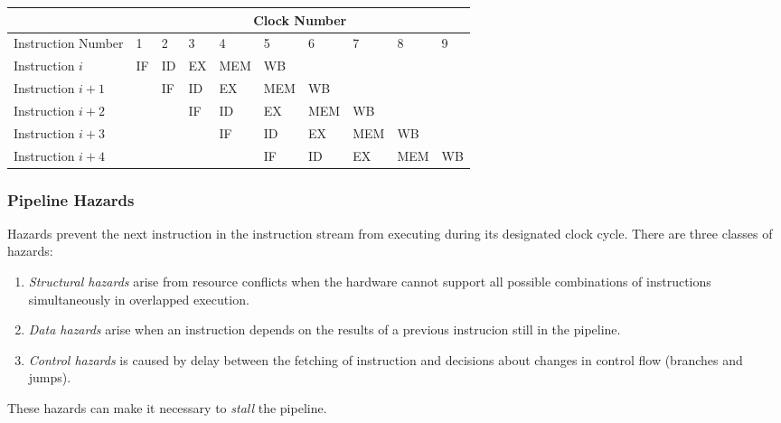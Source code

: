 \documentclass[12pt, a4paper]{article}
\theoremstyle{margin}
\begin{document}
      \begin{table}[H]
      \centering
      \begin{tabular}{|l|l|l|l|l|l|l|l|l|l|}
      \hline
                         & \multicolumn{9}{c|}{Clock Number}               \\ \hline
      Instruction Number & 1  & 2  & 3  & 4   & 5   & 6   & 7   & 8   & 9  \\ \hline
      Instruction $i$    & IF & ID & EX & MEM & WB  &     &     &     &    \\ \hline
      Instruction $i+1$  &    & IF & ID & EX  & MEM & WB  &     &     &    \\ \hline
      Instruction $i+2$  &    &    & IF & ID  & EX  & MEM & WB  &     &    \\ \hline
      Instruction $i+3$  &    &    &    & IF  & ID  & EX  & MEM & WB  &    \\ \hline
      Instruction $i+4$  &    &    &    &     & IF  & ID  & EX  & MEM & WB \\ \hline
      \end{tabular}
      \end{table}

    \subsubsection{Pipeline Hazards}

      Hazards prevent the next instruction in the instruction stream from executing during its designated clock cycle. There are three classes of hazards\cite{caqa}:
      \begin{enumerate}
        \item \emph{Structural hazards} arise from resource conflicts when the hardware cannot support all possible combinations of instructions simultaneously in overlapped execution.
        \item \emph{Data hazards} arise when an instruction depends on the results of a previous instrucion still in the pipeline.
        \item \emph{Control hazards} is caused by delay between the fetching of instruction and decisions about changes in control flow (branches and jumps).
      \end{enumerate}

      These hazards can make it necessary to \emph{stall} the pipeline.
\end{document}
